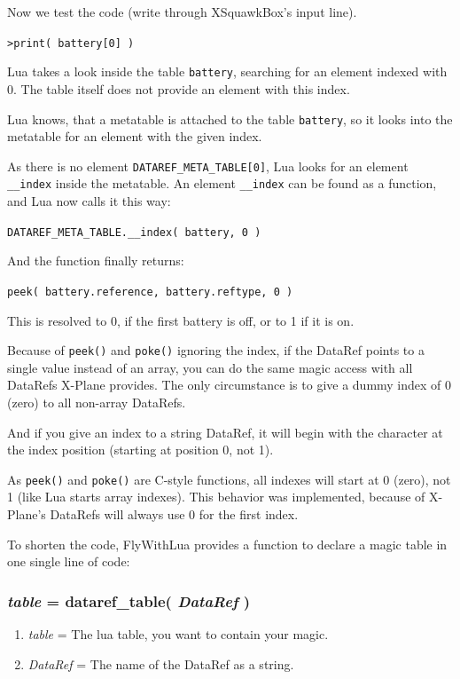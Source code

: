 \documentclass[11pt,parskip=half,a4paper]{scrartcl}
\begin{document}
Now we test the code (write through XSquawkBox's input line).

\verb|>print( battery[0] )|

Lua takes a look inside the table \verb|battery|, searching for an element indexed with 0. The table itself does not provide an element with this index.

Lua knows, that a metatable is attached to the table \verb|battery|, so it looks into the metatable for an element with the given index.

As there is no element \verb|DATAREF_META_TABLE[0]|, Lua looks for an element \verb|__index| inside the metatable. An element \verb|__index| can be found as a function, and Lua now calls it this way:

\verb|DATAREF_META_TABLE.__index( battery, 0 )|

And the function finally returns:

\verb|peek( battery.reference, battery.reftype, 0 )|

This is resolved to 0, if the first battery is off, or to 1 if it is on.

Because of \verb|peek()| and \verb|poke()| ignoring the index, if the DataRef points to a single value instead of an array, you can do the same magic access with all DataRefs X-Plane provides. The only circumstance is to give a dummy index of 0 (zero) to all non-array DataRefs.

And if you give an index to a string DataRef, it will begin with the character at the index position (starting at position 0, not 1).

As \verb|peek()| and \verb|poke()| are C-style functions, all indexes will start at 0 (zero), not 1 (like Lua starts array indexes). This behavior was implemented, because of X-Plane's DataRefs will always use 0 for the first index.

To shorten the code, FlyWithLua provides a function to declare a magic table in one single line of code:

\subsubsection{\emph{table} = dataref\_table( \emph{DataRef} )}

\begin{enumerate}
	\item \emph{table} = The lua table, you want to contain your magic.
	\item \emph{DataRef} = The name of the DataRef as a string.
\end{enumerate}
\end{document}

